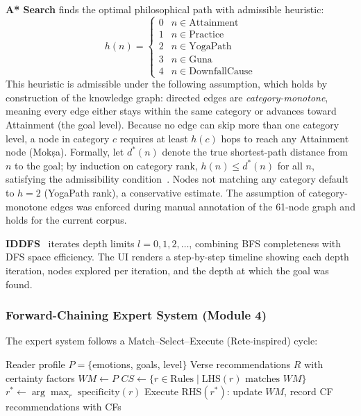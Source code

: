 \documentclass[conference]{IEEEtran}
\begin{document}
\textbf{A* Search} finds the optimal philosophical path with admissible
heuristic:
\begin{equation}
  h(n) = \begin{cases}
    0 & n \in \text{Attainment} \\
    1 & n \in \text{Practice} \\
    2 & n \in \text{YogaPath} \\
    3 & n \in \text{Guna} \\
    4 & n \in \text{DownfallCause}
  \end{cases}
  \label{eq:heuristic}
\end{equation}
This heuristic is admissible under the following assumption, which holds
by construction of the knowledge graph: directed edges are
\textit{category-monotone}, meaning every edge either stays within the same
category or advances toward Attainment (the goal level). Because no edge
can skip more than one category level, a node in category $c$ requires at
least $h(c)$ hops to reach any Attainment node (Mok\d{s}a). Formally, let
$d^*(n)$ denote the true shortest-path distance from $n$ to the goal; by
induction on category rank, $h(n) \leq d^*(n)$ for all $n$, satisfying
the admissibility condition~\cite{hart1968formal}. Nodes not matching any
category default to $h = 2$ (YogaPath rank), a conservative estimate. The
assumption of category-monotone edges was enforced during manual annotation
of the 61-node graph and holds for the current corpus.

\textbf{IDDFS}~\cite{korf1985depth} iterates depth limits $l = 0, 1, 2,\ldots$,
combining BFS completeness with DFS space efficiency. The UI renders a
step-by-step timeline showing each depth iteration, nodes explored per
iteration, and the depth at which the goal was found.

\subsubsection{Forward-Chaining Expert System (Module 4)}

The expert system follows a Match--Select--Execute (Rete-inspired) cycle:

\begin{algorithm}[t]
\caption{Forward-Chaining Expert System Inference}
\label{alg:expert}
\begin{algorithmic}
\REQUIRE Reader profile $P = \{$emotions, goals, level$\}$
\ENSURE Verse recommendations $R$ with certainty factors
\STATE $WM \leftarrow P$
\REPEAT
  \STATE $CS \leftarrow \{r \in \text{Rules} \mid \text{LHS}(r) \text{ matches } WM\}$
    \STATE $r^* \leftarrow \arg\max_r\;\text{specificity}(r)$
    \STATE Execute RHS$(r^*)$: update $WM$, record CF
  \ENDIF
{}
\RETURN recommendations with CFs
\end{algorithmic}
\end{algorithm}
\end{document}
